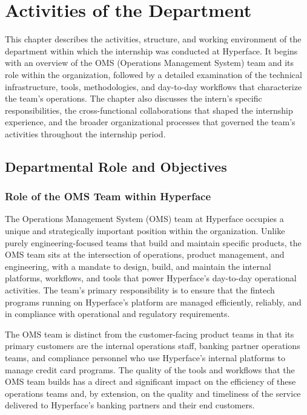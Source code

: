 \chapter{Activities of the Department}

This chapter describes the activities, structure, and working environment of the department within which the internship was conducted at Hyperface. It begins with an overview of the OMS (Operations Management System) team and its role within the organization, followed by a detailed examination of the technical infrastructure, tools, methodologies, and day-to-day workflows that characterize the team's operations. The chapter also discusses the intern's specific responsibilities, the cross-functional collaborations that shaped the internship experience, and the broader organizational processes that governed the team's activities throughout the internship period.

\section{Departmental Role and Objectives}

\subsection{Role of the OMS Team within Hyperface}

The Operations Management System (OMS) team at Hyperface occupies a unique and strategically important position within the organization. Unlike purely engineering-focused teams that build and maintain specific products, the OMS team sits at the intersection of operations, product management, and engineering, with a mandate to design, build, and maintain the internal platforms, workflows, and tools that power Hyperface's day-to-day operational activities. The team's primary responsibility is to ensure that the fintech programs running on Hyperface's platform are managed efficiently, reliably, and in compliance with operational and regulatory requirements.

The OMS team is distinct from the customer-facing product teams in that its primary customers are the internal operations staff, banking partner operations teams, and compliance personnel who use Hyperface's internal platforms to manage credit card programs. The quality of the tools and workflows that the OMS team builds has a direct and significant impact on the efficiency of these operations teams and, by extension, on the quality and timeliness of the service delivered to Hyperface's banking partners and their end customers.

